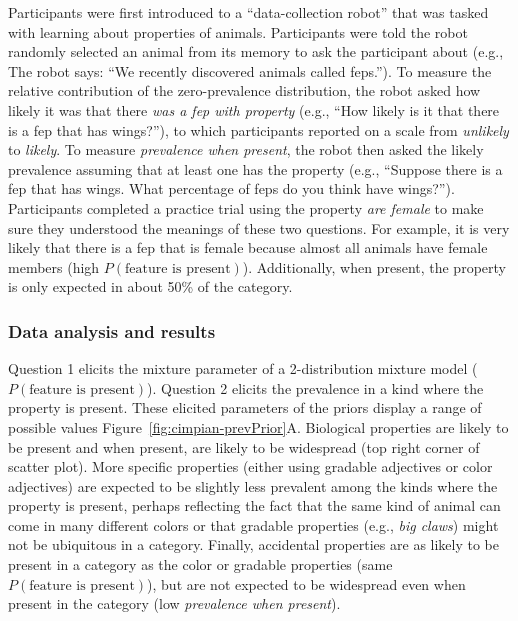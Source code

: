 \documentclass[,man,floatsintext]{apa6}
\theoremstyle{definition}
\theoremstyle{definition}
\theoremstyle{definition}
\theoremstyle{remark}
\begin{document}
Participants were first introduced to a \enquote{data-collection robot}
that was tasked with learning about properties of animals. Participants
were told the robot randomly selected an animal from its memory to ask
the participant about (e.g., The robot says: \enquote{We recently
discovered animals called feps.}). To measure the relative contribution
of the zero-prevalence distribution, the robot asked how likely it was
that there \emph{was a fep with property} (e.g., \enquote{How likely is
it that there is a fep that has wings?}), to which participants reported
on a scale from \emph{unlikely} to \emph{likely}. To measure
\emph{prevalence when present}, the robot then asked the likely
prevalence assuming that at least one has the property (e.g.,
\enquote{Suppose there is a fep that has wings. What percentage of feps
do you think have wings?}). Participants completed a practice trial
using the property \emph{are female} to make sure they understood the
meanings of these two questions. For example, it is very likely that
there is a fep that is female because almost all animals have female
members (high \(P(\text{feature is present})\)). Additionally, when
present, the property is only expected in about 50\% of the category.

\hypertarget{data-analysis-and-results}{%
\subsubsection{Data analysis and
results}\label{data-analysis-and-results}}

Question 1 elicits the mixture parameter of a 2-distribution mixture
model (\(P(\text{feature is present})\)). Question 2 elicits the
prevalence in a kind where the property is present. These elicited
parameters of the priors display a range of possible values
Figure~\ref{fig:cimpian-prevPrior}A. Biological properties are likely to
be present and when present, are likely to be widespread (top right
corner of scatter plot). More specific properties (either using gradable
adjectives or color adjectives) are expected to be slightly less
prevalent among the kinds where the property is present, perhaps
reflecting the fact that the same kind of animal can come in many
different colors or that gradable properties (e.g., \emph{big claws})
might not be ubiquitous in a category. Finally, accidental properties
are as likely to be present in a category as the color or gradable
properties (same \(P(\text{feature is present})\)), but are not expected
to be widespread even when present in the category (low \emph{prevalence
when present}).
\end{document}
